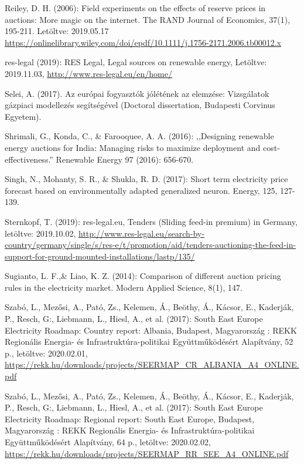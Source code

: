 \documentclass[twoside, magyar, showtrims]{corvinusphd}
\theoremstyle{plain}
\theoremstyle{remark}
\theoremstyle{definition}
\begin{document}
\begin{thebibliography}{99}
    Reiley, D. H. (2006): Field experiments on the effects of reserve prices in auctions: More magic on the internet. The RAND Journal of Economics, 37(1), 195-211. Letöltve: 2019.05.17
    \url{ https://onlinelibrary.wiley.com/doi/epdf/10.1111/j.1756-2171.2006.tb00012.x}

res-legal (2019): RES Legal, Legal sources on renewable energy, Letöltve: 2019.11.03,
\url{http://www.res-legal.eu/en/home/}

Selei, A. (2017). Az európai fogyasztók jólétének az elemzése: Vizsgálatok gázpiaci modellezés segítségével (Doctoral dissertation, Budapesti Corvinus Egyetem).

Shrimali, G., Konda, C., \& Farooquee, A. A. (2016): ,,Designing renewable energy auctions for India: Managing risks to maximize deployment and cost-effectiveness.'' Renewable Energy 97 (2016): 656-670.

Singh, N., Mohanty, S. R., \& Shukla, R. D. (2017): Short term electricity price forecast based on environmentally adapted generalized neuron. Energy, 125, 127-139.

Sternkopf, T. (2019): res-legal.eu, Tenders (Sliding feed-in premium) in Germany, letöltve: 2019.10.02,
\url{http://www.res-legal.eu/search-by-country/germany/single/s/res-e/t/promotion/aid/tenders-auctioning-the-feed-in-support-for-ground-mounted-installations/lastp/135/}

Sugianto, L. F.,\& Liao, K. Z. (2014): Comparison of different auction pricing rules in the electricity market. Modern Applied Science, 8(1), 147.

Szabó, L., Mezősi, A., Pató, Zs., Kelemen, Á., Beöthy, Á., Kácsor, E., Kaderják, P., Resch, G:, Liebmann, L., Hiesl, A., et al. (2017): South East Europe Electricity Roadmap: Country report: Albania, Budapest, Magyarország : REKK Regionális Energia- és Infrastruktúra-politikai Együttműködésért Alapítvány, 52 p., letöltve: 2020.02.01,
\url{https://rekk.hu/downloads/projects/SEERMAP_CR_ALBANIA_A4_ONLINE.pdf}

Szabó, L., Mezősi, A., Pató, Zs., Kelemen, Á., Beöthy, Á., Kácsor, E., Kaderják, P., Resch, G:, Liebmann, L., Hiesl, A., et al. (2017): South East Europe Electricity Roadmap: Regional report: South East Europe, Budapest, Magyarország : REKK Regionális Energia- és Infrastruktúra-politikai Együttműködésért Alapítvány, 64 p., letöltve: 2020.02.02,
\url{https://rekk.hu/downloads/projects/SEERMAP_RR_SEE_A4_ONLINE.pdf}


\end{thebibliography}
\end{document}
